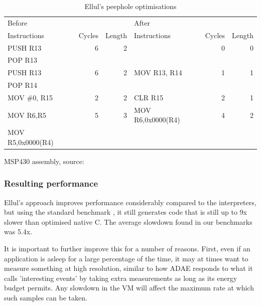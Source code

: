 \begin{table}
\caption{Ellul's peephole optimisations}
\label{tbl-ellul-peephole}
    \begin{threeparttable}
    \begin{tabular}{lrrlrr}
    \toprule
    Before            &        &        & After             &        & \\
    Instructions      & Cycles & Length & Instructions      & Cycles & Length \\
    \midrule
    \midrule
    PUSH R13          & 6      & 2      &                   & 0      & 0 \\
    POP R13           &        &        &                   &        & \\
    \midrule
    PUSH R13          & 6      & 2      & MOV R13, R14      & 1      & 1 \\
    POP R14           &        &        &                   &        & \\
    \midrule
    MOV \#0, R15      & 2      & 2      & CLR R15           & 2      & 1 \\
    \midrule
    MOV R6,R5         & 5      & 3      & MOV R6,0x0000(R4) & 4      & 2 \\
    MOV R5,0x0000(R4) &        &        &                   &        & \\
    \bottomrule
    \end{tabular}
    \begin{tablenotes}
    \item MSP430 assembly, source: \cite{Ellul:2012thesis}
    \end{tablenotes}
    \end{threeparttable}
\end{table}

\subsubsection{Resulting performance}
Ellul's approach improves performance considerably compared to the interpreters, but using the standard  benchmark \cite{coremark}, it still generates code that is still up to 9x slower than optimised native C. The average slowdown found in our benchmarks was 5.4x.

It is important to further improve this for a number of reasons. First, even if an application is asleep for a large percentage of the time, it may at times want to measure something at high resolution, similar to how ADAE \cite{Chang:2010ek} responds to what it calls 'interesting events' by taking extra measurements as long as its energy budget permits. Any slowdown in the VM will affect the maximum rate at which such samples can be taken.

